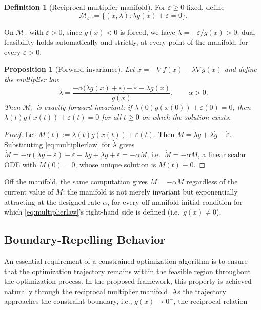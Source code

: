 \documentclass[11pt,onecolumn]{article}
\newtheorem{proposition}[theorem]{Proposition}
\theoremstyle{definition}
\newtheorem{definition}[theorem]{Definition}
\theoremstyle{remark}
\newcommand{\Mveps}{\mathcal{M}_\varepsilon}
\begin{document}
\begin{definition}[Reciprocal multiplier manifold]
For $\varepsilon \ge 0$ fixed, define
\begin{equation}
\Mveps := \{(x, \lambda) : \lambda g(x) + \varepsilon = 0\}. \label{eq:manifold}
\end{equation}
\end{definition}
On $\Mveps$ with $\varepsilon > 0$, since $g(x) < 0$ is forced, we have
$\lambda = -\varepsilon/g(x) > 0$: dual feasibility holds automatically and strictly, at every
point of the manifold, for every $\varepsilon > 0$.

\begin{proposition}[Forward invariance] \label{prop:invariance}
Let $\dot x = -\nabla f(x) - \lambda \nabla g(x)$ and define the multiplier law
\begin{equation}
\dot\lambda = \frac{-\alpha\big(\lambda g(x) + \varepsilon\big) - \dot\varepsilon
  - \lambda \dot g(x)}{g(x)}, \qquad \alpha > 0. \label{eq:multiplierlaw}
\end{equation}
Then $\Mveps$ is exactly forward invariant: if $\lambda(0) g(x(0)) + \varepsilon(0) = 0$, then
$\lambda(t) g(x(t)) + \varepsilon(t) = 0$ for all $t \ge 0$ on which the solution exists.
\end{proposition}

\begin{proof}
Let $M(t) := \lambda(t) g(x(t)) + \varepsilon(t)$. Then
$\dot M = \dot\lambda g + \lambda \dot g + \dot\varepsilon$. Substituting
\eqref{eq:multiplierlaw} for $\dot\lambda$ gives
$\dot M = -\alpha(\lambda g + \varepsilon) - \dot\varepsilon - \lambda \dot g + \lambda \dot g
+ \dot\varepsilon = -\alpha M$, i.e.\ $\dot M = -\alpha M$, a linear scalar ODE with
$M(0) = 0$, whose unique solution is $M(t) \equiv 0$.
\end{proof}

Off the manifold, the same computation gives $\dot M = -\alpha M$ regardless of the current
value of $M$: the manifold is not merely invariant but exponentially attracting at the designed
rate $\alpha$, for every off-manifold initial condition for which \eqref{eq:multiplierlaw}'s
right-hand side is defined (i.e.\ $g(x) \ne 0$).

\subsection{Boundary-Repelling Behavior}

An essential requirement of a constrained optimization algorithm is to ensure that the optimization trajectory remains within the feasible region throughout the optimization process. In the proposed framework, this property is achieved naturally through the reciprocal multiplier manifold. As the trajectory approaches the constraint boundary, i.e., $g(x)\rightarrow0^{-}$, the reciprocal relation
\end{document}
